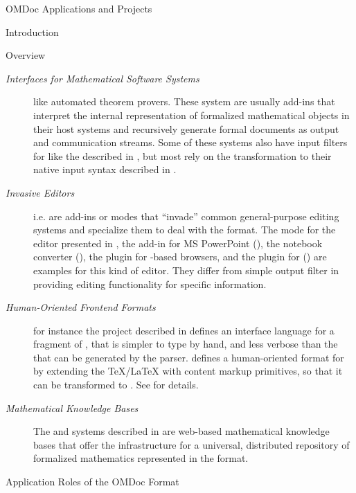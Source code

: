 \begin{tchapter}[id=projects,short=Applications and Projects]{OMDoc Applications and Projects}
\begin{tsection}[id=projeccts-intro]{Introduction}
\begin{tsubsection}[id=projects-overview]{Overview}
\begin{description}
\item[{\emph{Interfaces for Mathematical Software Systems}}] like
  automated theorem provers. These system are usually add-ins that interpret the internal
  representation of formalized mathematical objects in their host systems and recursively
  generate formal {\omdoc} documents as output and communication streams. Some of these
  systems also have input filters for {\omdoc} like the {\verifun} described in
  {}, but most rely on the {\omdoc} transformation to their native input
  syntax described in {}.
\item[\emph{Invasive Editors}] i.e. are add-ins or modes that
  ``invade'' common general-purpose editing systems and specialize them to deal with the
  {\omdoc} format.  The {\omdoc} mode for the {\emacs} editor presented in
  {}, the {\cpoint} add-in for MS PowerPoint ({}),
  the {\mathematica} notebook converter ({}), the {\sentido} plugin for
  {\mozilla}-based browsers, and the plugin for {\texmacs} ({})
  are examples for this kind of editor. They differ from simple output filter in providing
  editing functionality for {\omdoc} specific information.
\item[\emph{Human-Oriented Frontend Formats}] for
  instance the {\qmath} project described in {} defines an interface
  language for a fragment of {\omdoc}, that is simpler to type by hand, and less verbose
  than the {\omdoc} that can be generated by the {} parser. {\stex} defines
  a human-oriented format for {\omdoc} by extending the {\TeX/\LaTeX} with content markup
  primitives, so that it can be transformed to {\omdoc}. See {} for
  details.
\item [\emph{Mathematical Knowledge Bases}] The
  {\mbase} and {\maya} systems described in {} are web-based
  mathematical knowledge bases that offer the infrastructure for a universal, distributed
  repository of formalized mathematics represented in the {\omdoc} format.
\end{description}
\end{tsubsection}

\begin{tsubsection}[id=omdoc-roles]{Application Roles of the OMDoc Format}


\end{tsubsection}
\end{tsection}
\end{tchapter}

